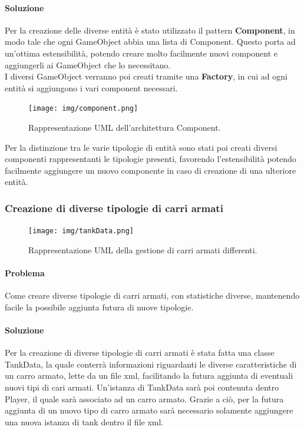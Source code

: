 \documentclass[a4paper,12pt]{report}
\begin{document}
\paragraph*{Soluzione} Per la creazione delle diverse entità è stato utilizzato il pattern \textbf{Component}, in modo tale che ogni GameObject abbia una lista di Component. Questo porta ad un’ottima estensibilità, potendo creare molto facilmente nuovi component e aggiungerli ai GameObject che lo necessitano.\\ 
I diversi GameObject verranno poi creati tramite una \textbf{Factory}, in cui ad ogni entità si aggiungono i vari component necessari.
%
\begin{figure}[H]
	\centering{}
	\texttt{[image: img/component.png]}
	\caption{Rappresentazione UML dell'architettura Component.}
	\label{img:strategy}
	\end{figure}
%
Per la distinzione tra le varie tipologie di entità sono stati poi creati diversi componenti rappresentanti le tipologie presenti, favorendo l’estensibilità potendo facilmente aggiungere un nuovo componente in caso di creazione di una ulteriore entità.
\newpage
\subsubsection*{Creazione di diverse tipologie di carri armati}
%
\begin{figure}[H]
	\centering{}
	\texttt{[image: img/tankData.png]}
	\caption{Rappresentazione UML della gestione di carri armati differenti.}
	\label{img:strategy}
	\end{figure}
%	
\paragraph*{Problema} Come creare diverse tipologie di carri armati, con statistiche diverse, mantenendo facile la possibile aggiunta futura di nuove tipologie.
%
\paragraph*{Soluzione} Per la creazione di diverse tipologie di carri armati è stata fatta una classe TankData, la quale conterrà informazioni riguardanti le diverse caratteristiche di un carro armato, lette da un file xml, facilitando la futura aggiunta di eventuali nuovi tipi di cari armati. Un’istanza di TankData sarà poi contenuta dentro Player, il quale sarà associato ad un carro armato. Grazie a ciò, per la futura aggiunta di un nuovo tipo di carro armato sarà necessario solamente aggiungere una nuova istanza di tank dentro il file xml.
%
\newpage
\end{document}
